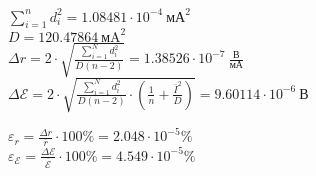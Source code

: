 
\begin{center}
    $\sum\limits_{i=1}^{n}d_i^2 = 1.08481 \cdot 10^{-4} \ \text{мА}^2$ \\
    $D = 120.47864 \ \text{мA}^2$ \\
    $\Delta r = 2 \cdot \sqrt{\frac{\sum\limits_{i=1}^N d_i^2}{D (n-2)}} = 1.38526 \cdot 10^{-7} \ \frac{\text{В}}{мА}$ \\
    $\Delta \mathscr{E} = 2 \cdot \sqrt{\frac{\sum\limits_{i=1}^N d_i^2}{D (n-2)}\cdot \left(\frac{1}{n} + \frac{\overline{I}^2}{D}\right)} = 9.60114 \cdot 10^{-6} \ \text{В}$
\end{center}


\begin{center}
    $\varepsilon_r = \frac{\Delta r}{\overline{r}} \cdot 100\% = 2.048 \cdot 10^{-5}\%$ \\
    $\varepsilon_{\mathscr{E}} = \frac{\Delta \mathscr{E}}{\overline{\mathscr{E}}} \cdot 100\% = 4.549 \cdot 10^{-5}\%$
\end{center}
